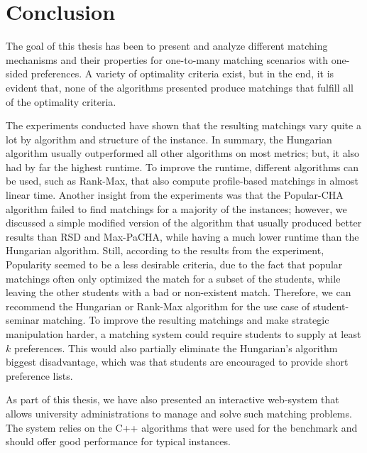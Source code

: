 \section{Conclusion}

The goal of this thesis has been to present and analyze different matching mechanisms and their properties for one-to-many matching scenarios with one-sided preferences. A variety of optimality criteria exist, but in the end, it is evident that, none of the algorithms presented produce matchings that fulfill all of the optimality criteria. 

The experiments conducted have shown that the resulting matchings vary quite a lot by algorithm and structure of the instance. In summary, the Hungarian algorithm usually outperformed all other algorithms on most metrics; but, it also had by far the highest runtime. To improve the runtime, different algorithms can be used, such as Rank-Max, that also compute profile-based matchings in almost linear time. Another insight from the experiments was that the Popular-CHA algorithm failed to find matchings for a majority of the instances; however, we discussed a simple modified version of the algorithm that usually produced better results than RSD and Max-PaCHA, while having a much lower runtime than the Hungarian algorithm. Still, according to the results from the experiment, Popularity seemed to be a less desirable criteria, due to the fact that popular matchings often only optimized the match for a subset of the students, while leaving the other students with a bad or non-existent match. Therefore, we can recommend the Hungarian or Rank-Max algorithm for the use case of student-seminar matching. To improve the resulting matchings and make strategic manipulation harder, a matching system could require students to supply at least $k$ preferences. This would also partially eliminate the Hungarian's algorithm biggest disadvantage, which was that students are encouraged to provide short preference lists.

As part of this thesis, we have also presented an interactive web-system that allows university administrations to manage and solve such matching problems. The system relies on the C++ algorithms that were used for the benchmark and should offer good performance for typical instances.  